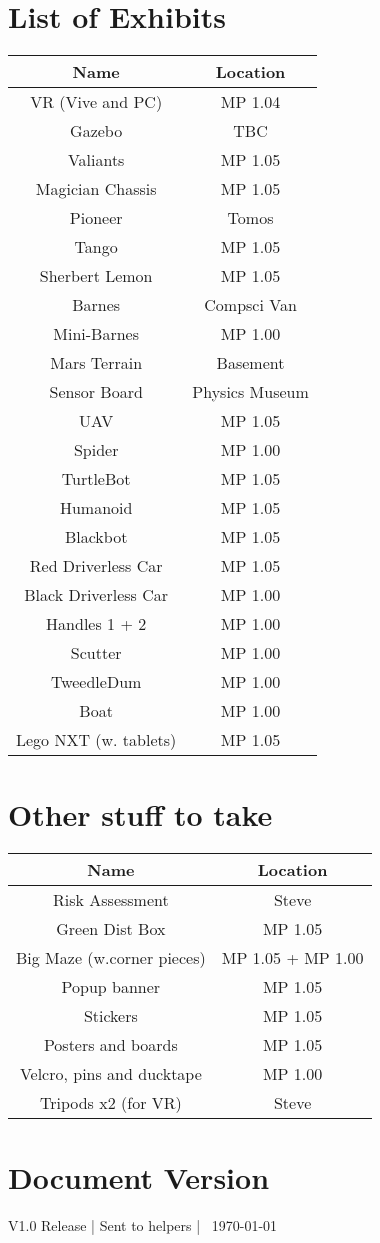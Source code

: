 \documentclass[a4paper]{article}
\begin{document}
\section*{List of Exhibits}
\begin{center}
\begin{tabular}{ |c|c| } 
\hline
Name & Location \\
\hline
\hline
VR (Vive and PC) & MP 1.04 \\ 
\hline
Gazebo & TBC \\
\hline
Valiants & MP 1.05 \\
\hline
Magician Chassis & MP 1.05 \\
\hline
Pioneer & Tomos \\
\hline
Tango & MP 1.05 \\
\hline
Sherbert Lemon & MP 1.05 \\
\hline
Barnes & Compsci Van \\
\hline
Mini-Barnes & MP 1.00 \\
\hline
Mars Terrain & Basement \\
\hline
Sensor Board & Physics Museum \\
\hline
UAV & MP 1.05 \\
\hline
Spider & MP 1.00 \\
\hline
TurtleBot & MP 1.05 \\
\hline
Humanoid & MP 1.05 \\
\hline
Blackbot & MP 1.05 \\
\hline
Red Driverless Car & MP 1.05 \\
\hline
Black Driverless Car & MP 1.00 \\
\hline
Handles 1 + 2 & MP 1.00 \\
\hline
Scutter & MP 1.00 \\
\hline 
TweedleDum & MP 1.00 \\
\hline
Boat & MP 1.00 \\
\hline
Lego NXT (w. tablets) & MP 1.05 \\
\hline
\end{tabular}
\end{center}

\section*{Other stuff to take}
\begin{center}
\begin{tabular}{ |c|c| } 
\hline
Name & Location \\
\hline
\hline
Risk Assessment & Steve \\ 
\hline
Green Dist Box & MP 1.05 \\ 
\hline
Big Maze (w.corner pieces) & MP 1.05 + MP 1.00 \\ 
\hline
Popup banner & MP 1.05 \\
\hline
Stickers & MP 1.05 \\
\hline
Posters and boards & MP 1.05 \\
\hline
Velcro, pins and ducktape & MP 1.00 \\
\hline
Tripods x2 (for VR) & Steve \\
\hline 
\end{tabular}
\end{center}

\section*{Document Version}
V1.0 Release | Sent to helpers | \currenttime \ \today
\end{document}

